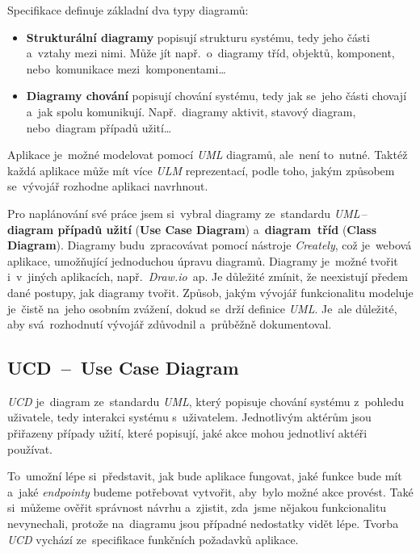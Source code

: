 \documentclass[11pt,a4paper]{report}
\begin{document}
            Specifikace definuje základní dva typy diagramů:
            \begin{itemize}
                \item \textbf{Strukturální diagramy} popisují strukturu systému, tedy jeho části a~vztahy mezi nimi. Může jít např.~o~diagramy tříd, objektů, komponent, nebo~komunikace mezi~komponentami\dots
                \item \textbf{Diagramy chování} popisují chování systému, tedy jak se~jeho části chovají a~jak spolu komunikují. Např.~diagramy aktivit, stavový diagram, nebo~diagram případů užití\dots
            \end{itemize}

            Aplikace je~možné modelovat pomocí \emph{UML} diagramů, ale~není to~nutné. Taktéž každá aplikace může mít více \emph{ULM} reprezentací, podle toho, jakým způsobem se~vývojář rozhodne aplikaci navrhnout. \cite{uml:diagram}

            Pro naplánování své práce jsem si~vybral diagramy ze~standardu \emph{UML}\,--\,\textbf{diagram případů užití} (\textbf{Use Case Diagram}) a~\textbf{diagram~tříd} (\textbf{Class Diagram}). Diagramy budu~zpracovávat pomocí nástroje \emph{Creately}, což je~webová aplikace, umožňující jednoduchou úpravu diagramů. Diagramy je~možné tvořit i~v~jiných aplikacích, např.~\emph{Draw.io}~ap. Je důležité zmínit, že neexistují předem dané postupy, jak diagramy tvořit. Způsob, jakým vývojář funkcionalitu modeluje je~čistě na~jeho osobním zvážení, dokud se~drží definice \emph{UML}. Je~ale důležité, aby svá~rozhodnutí vývojář zdůvodnil a~průběžně dokumentoval. \cite{uml:diagram}

            \subsection{UCD~--~Use Case Diagram}
                \emph{UCD} je~diagram ze~standardu \emph{UML}, který popisuje chování systému z~pohledu uživatele, tedy interakci systému s~uživatelem. Jednotlivým aktérům jsou přiřazeny případy užití, které popisují, jaké akce mohou jednotliví aktéři používat.

                To~umožní lépe si~představit, jak bude aplikace fungovat, jaké funkce bude mít a~jaké \emph{endpointy} budeme potřebovat vytvořit, aby~bylo možné akce provést. Také si~můžeme ověřit správnost návrhu a~zjistit, zda~jsme nějakou funkcionalitu nevynechali, protože na~diagramu jsou případné nedostatky vidět lépe. Tvorba \emph{UCD} vychází ze~specifikace funkčních požadavků aplikace. \cite{uml:usecase}
\end{document}
